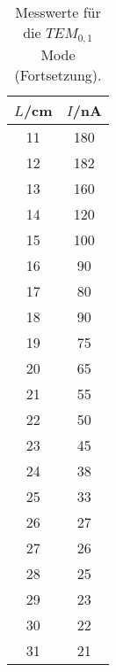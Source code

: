 \begin{table}[htp]
	\begin{center}
    \caption{Messwerte für die $TEM_{0,1}$ Mode (Fortsetzung).}
    \label{tab:tem01b}
		\begin{tabular}{cc}
		\toprule
			{$L$/cm} & {$I$/nA}\\
			\midrule
      11 & 180\\
      12 & 182\\
      13 & 160\\
      14 & 120\\
      15 & 100\\
      16 & 90\\
      17 & 80\\
      18 & 90\\
      19 & 75\\
      20 & 65\\
      21 & 55\\
      22 & 50\\
      23 & 45\\
      24 & 38\\
      25 & 33\\
      26 & 27\\
      27 & 26\\
      28 & 25\\
      29 & 23\\
      30 & 22\\
      31 & 21\\
      \bottomrule
  	\end{tabular}
  \end{center}
\end{table}


